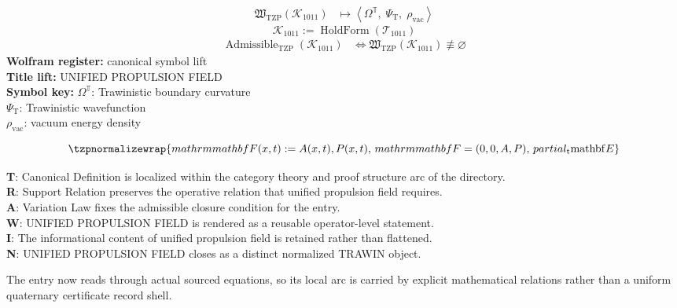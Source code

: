 \noindent
\begin{minipage}[t]{0.48\linewidth}
\begingroup
\small
\[
\begin{aligned}
\mathfrak{W}_{\mathrm{TZP}}\!\left(\mathcal{K}_{1011}\right)
&\longmapsto
\left\langle \Omega^{\mathbb{T}},\; \Psi_{\mathrm{T}},\; \rho_{\mathrm{vac}} \right\rangle
\end{aligned}
\]
\[
\mathcal{K}_{1011}
:=
\operatorname{HoldForm}\!\left(\mathcal{T}_{1011}\right)
\]
\[
\begin{aligned}
\operatorname{Admissible}_{\mathrm{TZP}}\!\left(\mathcal{K}_{1011}\right)
&\Longleftrightarrow
\mathfrak{W}_{\mathrm{TZP}}\!\left(\mathcal{K}_{1011}\right)\not\equiv\varnothing
\end{aligned}
\]
\textbf{Wolfram register:} canonical symbol lift\\
\textbf{Title lift:} UNIFIED PROPULSION FIELD\\
\textbf{Symbol key:} \(\Omega^{\mathbb{T}}\): Trawinistic boundary curvature\\ \(\Psi_{\mathrm{T}}\): Trawinistic wavefunction\\ \(\rho_{\mathrm{vac}}\): vacuum energy density
\par
\endgroup
\end{minipage}\hfill
\begin{minipage}[t]{0.48\linewidth}
\[
\tzpnormalizewrap{mathrm{mathbf}{F}(x,t) := A(x,t),P(x,t),\,mathrm{mathbf}{F} = (0,0,A,P),\,partial_{\mathrm{t}} \mathrm{mathbf}{E}}
\]

\small
\textbf{T}: Canonical Definition is localized within the category theory and proof structure arc of the directory.\\
\textbf{R}: Support Relation preserves the operative relation that unified propulsion field requires.\\
\textbf{A}: Variation Law fixes the admissible closure condition for the entry.\\
\textbf{W}: UNIFIED PROPULSION FIELD is rendered as a reusable operator-level statement.\\
\textbf{I}: The informational content of unified propulsion field is retained rather than flattened.\\
\textbf{N}: UNIFIED PROPULSION FIELD closes as a distinct normalized TRAWIN object.
\normalsize
\end{minipage}

The entry now reads through actual sourced equations, so its local arc is carried by explicit mathematical relations rather than a uniform quaternary certificate record shell.
\clearpage


